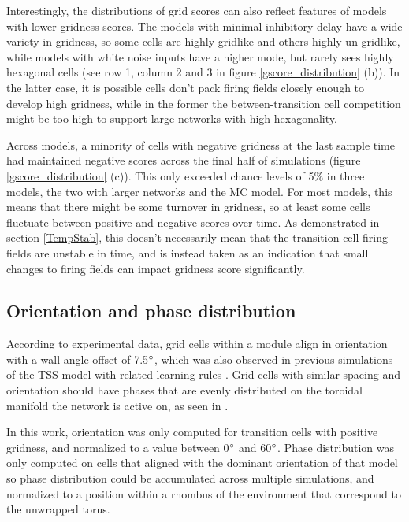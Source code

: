 \documentclass{article}
\begin{document}
    Interestingly, the distributions of grid scores can also reflect features of models with lower gridness scores. The models with minimal inhibitory delay have a wide variety in gridness, so some cells are highly gridlike and others highly un-gridlike, while models with white noise inputs have a higher mode, but rarely sees highly hexagonal cells (see row 1, column 2 and 3 in figure \ref{gscore_distribution} (b)). In the latter case, it is possible cells don't pack firing fields closely enough to develop high gridness, while in the former the between-transition cell competition might be too high to support large networks with high hexagonality.

    Across models, a minority of cells with negative gridness at the last sample time had maintained negative scores across the final half of simulations (figure \ref{gscore_distribution} (c)). This only exceeded chance levels of 5\% in three models, the two with larger networks and the MC model. For most models, this means that there might be some turnover in gridness, so at least some cells fluctuate between positive and negative scores over time. As demonstrated in section \ref{TempStab}, this doesn't necessarily mean that the transition cell firing fields are unstable in time, and is instead taken as an indication that small changes to firing fields can impact gridness score significantly. 

    \subsection{Orientation and phase distribution} \label{OrientationPhaseResults}

    According to experimental data, grid cells within a module align in orientation with a wall-angle offset of 7.5\(\degree\), which was also observed in previous simulations of the TSS-model with related learning rules \parencite{Stensola2015, Waniek2017}. Grid cells with similar spacing and orientation should have phases that are evenly distributed on the toroidal manifold the network is active on, as seen in \cite{Gardner2022}. 
    
    In this work, orientation was only computed for transition cells with positive gridness, and normalized to a value between 0\(\degree\) and 60\(\degree\). Phase distribution was only computed on cells that aligned with the dominant orientation of that model so phase distribution could be accumulated across multiple simulations, and normalized to a position within a rhombus of the environment that correspond to the unwrapped torus.
\end{document}
